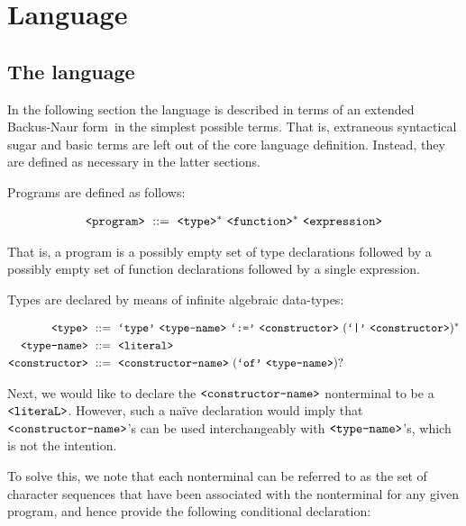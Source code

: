 \chapter{Language}

\section{The language }

In the following section the language  is described in terms of an
extended Backus-Naur form\footnotemark\ in the simplest possible terms. That
is, extraneous syntactical sugar and basic terms are left out of the core
language definition.  Instead, they are defined as necessary in the latter
sections.


Programs are defined as follows:

\begin{align}
\text{{\ttfamily<program>}}\ &::=\ \text{{\ttfamily<type>}}^*\ \text{{\ttfamily<function>}}^*
\ \text{{\ttfamily<expression>}}\\
\end{align}

That is, a program is a possibly empty set of type declarations followed by a
possibly empty set of function declarations followed by a single expression.

Types are declared by means of infinite algebraic data-types:

\begin{align}
\text{{\ttfamily<type>}}\ &::=\ \text{{\ttfamily`type'}}\ \text{{\ttfamily<type-name>}}
\ \text{{\ttfamily`:='}}\ \text{{\ttfamily<constructor>}}\ (\text{{\ttfamily`|'}}
\ \text{{\ttfamily<constructor>}})^*\\
\text{{\ttfamily<type-name>}}\ &::=\ \text{{\ttfamily<literal>}}\\
\text{{\ttfamily<constructor>}}\ &::=\ \text{{\ttfamily<constructor-name>}}
\ (\text{{\ttfamily`of'}}\ \text{{\ttfamily<type-name>}})?\\
\end{align}

Next, we would like to declare the $\text{{\ttfamily<constructor-name>}}$ nonterminal to
be a $\text{{\ttfamily<literaL>}}$. However, such a na\"ive declaration would imply
that $\text{{\ttfamily<constructor-name>}}$'s can be used interchangeably with
$\text{{\ttfamily<type-name>}}$'s, which is not the intention.

To solve this, we note that each nonterminal can be referred to as the set of
character sequences that have been associated with the nonterminal for any
given program, and hence provide the following conditional declaration:

